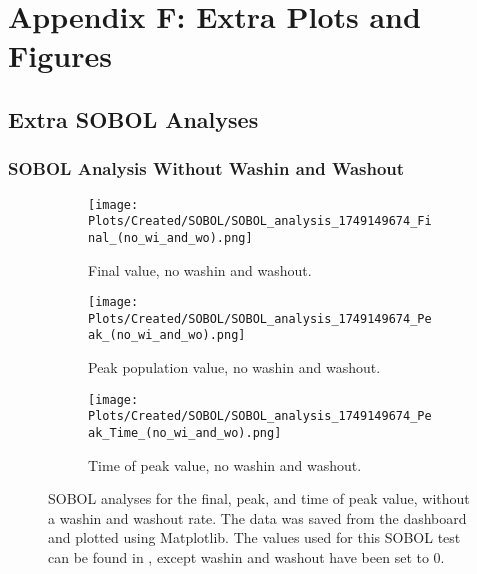 \chapter{Appendix F: Extra Plots and Figures}
\label{AppendixF}

\section{Extra SOBOL Analyses}
\label{sec:AppendixF:extra_SOBOL_analyses}

\subsection{SOBOL Analysis Without Washin and Washout}
\begin{figure}[ht!]
    \centering
    \begin{subfigure}{0.32\linewidth}
        \centering
        \captionsetup{width=1\linewidth}
        \texttt{[image: Plots/Created/SOBOL/SOBOL\_analysis\_1749149674\_Final\_(no\_wi\_and\_wo).png]}
        \caption{
            Final value, no washin and washout. 
        }
        \label{fig:created:SOBOL_final_no_wi_wo_extra}
    \end{subfigure}
    \hfill
    \begin{subfigure}{0.32\linewidth}
        \centering
        \captionsetup{width=1\linewidth}
        \texttt{[image: Plots/Created/SOBOL/SOBOL\_analysis\_1749149674\_Peak\_(no\_wi\_and\_wo).png]}
        \caption{
            Peak population value, no washin and washout. 
        }
        \label{fig:created:SOBOL_peak_no_wi_wo_extra}
    \end{subfigure}
    \hfill
    \begin{subfigure}{0.32\linewidth}
        \centering
        \captionsetup{width=1\linewidth}
        \texttt{[image: Plots/Created/SOBOL/SOBOL\_analysis\_1749149674\_Peak\_Time\_(no\_wi\_and\_wo).png]}
        \caption{
            Time of peak value, no washin and washout. 
        }
        \label{fig:created:SOBOL_peak_time_no_wi_wo_extra}
    \end{subfigure}
    \caption{
        SOBOL analyses for the final, peak, and time of peak value, without a washin and washout rate.
        The data was saved from the dashboard and plotted using Matplotlib. 
        The values used for this SOBOL test can be found in , except washin and washout have been set to 0. 
    }
    \label{fig:created:SOBOL_no_wi_wo_extra}
\end{figure}


